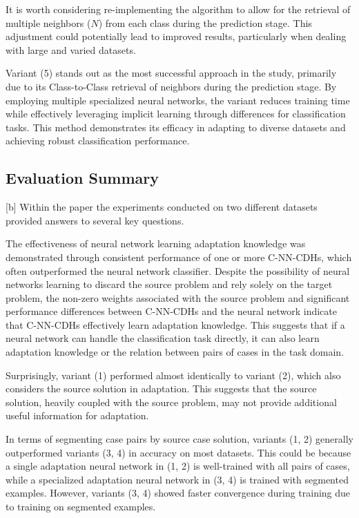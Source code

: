 \documentclass[a4paper, 12pt]{report}
\begin{document}
It is worth considering re-implementing the algorithm to allow for the retrieval of multiple neighbors ($N$) from each class during the prediction stage. 
This adjustment could potentially lead to improved results, particularly when dealing with large and varied datasets.

Variant (5) stands out as the most successful approach in the study, primarily due to its Class-to-Class retrieval of neighbors during the prediction stage. 
By employing multiple specialized neural networks, the variant reduces training time while effectively leveraging implicit learning through differences for classification tasks.
This method demonstrates its efficacy in adapting to diverse datasets and achieving robust classification performance.
\subsection{Evaluation Summary}[b]
Within the paper \cite{ye2021learning} the experiments conducted on two different datasets provided answers to several key questions.

The effectiveness of neural network learning adaptation knowledge was demonstrated through consistent performance of one or more C-NN-CDHs,
which often outperformed the neural network classifier. Despite the possibility of neural networks learning to discard the source problem and rely solely on the target problem,
the non-zero weights associated with the source problem and significant performance differences between C-NN-CDHs and the neural network indicate that C-NN-CDHs effectively learn adaptation knowledge.
This suggests that if a neural network can handle the classification task directly, it can also learn adaptation knowledge or the relation between pairs of cases in the task domain.

Surprisingly, variant (1) performed almost identically to variant (2),
which also considers the source solution in adaptation.
This suggests that the source solution, heavily coupled with the source problem, may not provide additional useful information for adaptation.

In terms of segmenting case pairs by source case solution, variants (1, 2) generally outperformed variants (3, 4) in accuracy on most datasets.
This could be because a single adaptation neural network in (1, 2) is well-trained with all pairs of cases, while a specialized adaptation neural network in (3, 4) is trained with segmented examples.
However, variants (3, 4) showed faster convergence during training due to training on segmented examples.
\end{document}
